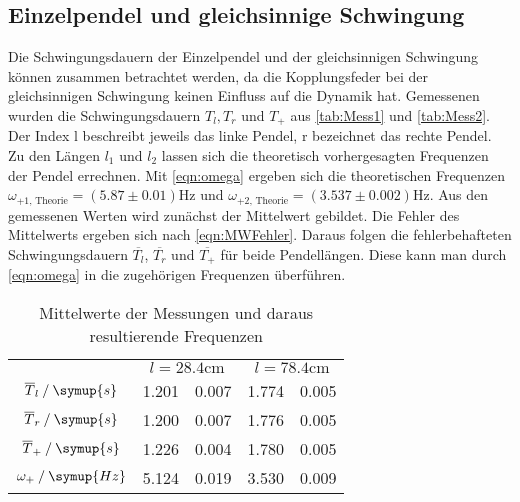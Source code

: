 \subsection{Einzelpendel und gleichsinnige Schwingung}
\label{subsec:Gleichsinnig}
Die Schwingungsdauern der Einzelpendel und der gleichsinnigen Schwingung können zusammen betrachtet werden, da die Kopplungsfeder bei der gleichsinnigen Schwingung 
keinen Einfluss auf die Dynamik hat. Gemessenen wurden die Schwingungsdauern $T_l, T_r$ und $T_+$ aus \autoref{tab:Mess1} und \autoref{tab:Mess2}.
Der Index l beschreibt jeweils das linke Pendel, r bezeichnet das rechte Pendel. Zu den Längen $l_1$ und $l_2$ lassen sich die 
theoretisch vorhergesagten Frequenzen der Pendel errechnen. Mit \autoref{eqn:omega} ergeben sich die theoretischen Frequenzen $\omega_{+1\text{, Theorie}} = (5.87\pm 0.01)\unit{\hertz}$ und 
$\omega_{+2\text{, Theorie}} = (3.537\pm 0.002)\unit{\hertz}$. Aus den gemessenen Werten wird zunächst der Mittelwert gebildet. Die Fehler des Mittelwerts ergeben sich nach \autoref{eqn:MWFehler}.
Daraus folgen die fehlerbehafteten Schwingungsdauern $\overline{T_l}$, $\overline{T_r}$ und $\overline{T_+}$ für beide Pendellängen. Diese kann man durch \autoref{eqn:omega} in 
die zugehörigen Frequenzen überführen.
\begin{table}
    \centering
    \caption{Mittelwerte der Messungen und daraus resultierende Frequenzen}
    \begin{tabular}{c S @{${}\pm{}$} S S @{${}\pm{}$} S}
    \toprule
    &  &  \\
    \cmidrule(lr){2-3}\cmidrule(lr){4-5}
    {$\overline{T}_l \mathbin{/} \symup{s}$}        & 1.201 & 0.007 & 1.774 & 0.005 \\
    {$\overline{T}_r \mathbin{/} \symup{s}$}        & 1.200 & 0.007 & 1.776 & 0.005 \\
    {$\overline{T}_+ \mathbin{/} \symup{s}$}        & 1.226 & 0.004 & 1.780 & 0.005 \\
    {$\omega_+ \mathbin{/} \symup{Hz}$}  & 5.124 & 0.019 & 3.530 & 0.009 \\
    \bottomrule
    \end{tabular}
\end{table}    

